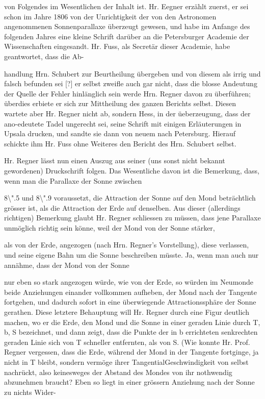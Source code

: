 \documentclass[10pt,a4paper]{article}
\begin{document}
von Folgendes im Wesentlichen der Inhalt ist. Hr. Eegner erzählt zuerst, er sei schon im Jahre 1806 von der Unrichtigkeit der von den Astronomen angenommenen Sonnenparallaxe überzeugt gewesen, und habe im Anfange des folgenden Jahres eine kleine Schrift darüber an die Petersburger Academie der Wissenschaften eingesandt. Hr. Fuss, als Secretär dieser Academie, habe geantwortet, dass die Ab-

handlung Hrn. Schubert zur Beurtheilung übergeben und von diesem als irrig und falsch befunden sei [?] er selbst zweifle auch gar nicht, dass die blosse Andeutung der Quelle der Fehler hinlänglich sein werde Hrn. Regner davon zu überführen; überdies erbiete er sich zur Mittheilung des ganzen Berichts selbst. Diesen wartete aber Hr. Regner nicht ab, sondern Hess, in der üeberzeugung, dass der ano-edeutete Tadel ungerecht sei, seine Schrift mit einigen Erläuterungen in Upsala drucken, und sandte sie dann von neuem nach Petersburg. Hierauf schickte ihm Hr. Fuss ohne Weiteres den Bericht des Hrn. Schubert selbst.

Hr. Regner lässt nun einen Auszug aus seiner (uns sonst nicht bekannt gewordenen) Druckschrift folgen. Das Wesentliche davon ist die Bemerkung, dass, wenn man die Parallaxe der Sonne zwischen

8\textbackslash{}".5 und 8\textbackslash{}".9 voraussetzt, die Attraction der Sonne auf den Mond beträchtlich grösser ist, als die Attraction der Erde auf denselben. Aus dieser (allerdings richtigen) Bemerkung glaubt Hr. Regner schliessen zu müssen, dass jene Parallaxe unmöglich richtig sein könne, weil der Mond von der Sonne stärker,

als von der Erde, angezogen (nach Hrn. Regner's Vorstellung), diese verlassen, und seine eigene Bahn um die Sonne beschreiben müsste. Ja, wenn man auch nur annähme, dass der Mond von der Sonne

nur eben so stark angezogen würde, wie von der Erde, so würden im Neumonde beide Anziehungen einander vollkommen aufheben, der Mond nach der Tangente fortgehen, und dadurch sofort in eine überwiegende Attractionssphäre der Sonne gerathen. Diese letztere Behauptung will Hr. Regner durch eine Figur deutlich machen, wo er die Erde, den Mond und die Sonne in einer geraden Linie durch T, b, S bezeichnet, und dann zeigt, dass die Punkte der in b errichteten senkrechten geraden Linie sich von T schneller entfernten, als von S. (Wie konnte Hr. Prof. Regner vergessen, dass die Erde, während der Mond in der Tangente fortginge, ja nicht in T bleibt, sondern vermöge ihrer TangentialGeschwindigkeit von selbst nachrückt, also keinesweges der Abstand des Mondes von ihr nothwendig abzunehmen braucht? Eben so liegt in einer grössern Anziehung nach der Sonne zu nichts Wider-
\end{document}
